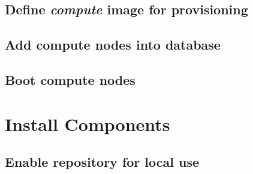 \documentclass{ohpc-doc}
\begin{document}
\section{Define {\em compute} image for provisioning}


\section{Add compute nodes into \Confluent{} database} \label{sec:confluent_add_nodes}


\section{Boot compute nodes} \label{sec:boot_computes}



\chapter{Install \OHPC{} Components} \label{sec:basic_install}


\section{Enable \OHPC{} repository for local use} \label{sec:enable_repo}


\end{document}
